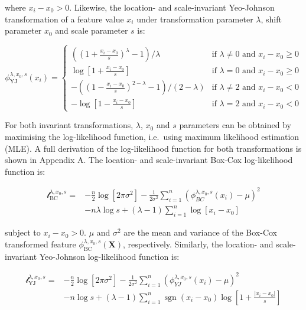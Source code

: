 \documentclass[
  a4paper,
]{article}
\DeclareMathOperator{\sgn}{sgn}
\begin{document}
where \(x_i - x_0 > 0\). Likewise, the location- and scale-invariant
Yeo-Johnson transformation of a feature value \(x_i\) under
transformation parameter \(\lambda\), shift parameter \(x_0\) and scale
parameter \(s\) is:

\begin{equation}
\label{eqn:yeo-johnson-invariant}
\phi_{\text{YJ}}^{\lambda, x_0, s} (x_i) = 
\begin{cases}
\left( \left( 1 + \frac{x_i - x_0}{s}\right)^\lambda - 1\right) / \lambda & \text{if } \lambda \neq 0 \text{ and } x_i - x_0 \geq 0\\
\log\left[1 + \frac{x_i - x_0}{s}\right] & \text{if } \lambda = 0 \text{ and } x_i - x_0 \geq 0\\
-\left( \left( 1 - \frac{x_i - x_0}{s}\right)^{2 - \lambda} - 1 \right) / \left(2 - \lambda \right) & \text{if } \lambda \neq 2 \text{ and } x_i - x_0 < 0\\
-\log\left[1 - \frac{x_i - x_0}{s}\right] & \text{if } \lambda = 2 \text{ and } x_i - x_0 < 0
\end{cases}
\end{equation}

For both invariant transformations, \(\lambda\), \(x_0\) and \(s\)
parameters can be obtained by maximising the log-likelihood function,
i.e.~using maximum likelihood estimation (MLE). A full derivation of the
log-likelihood function for both transformations is shown in Appendix A.
The location- and scale-invariant Box-Cox log-likelihood function is:

\begin{equation}
\label{eqn:box-cox-invariant-log-likelihood}
\begin{split}
\mathcal{l}_{\text{BC}}^{\lambda, x_0, s} = & -\frac{n}{2} \log \left[2 \pi \sigma^2 \right] -\frac{1}{2 \sigma^2} \sum_{i=1}^n \left( \phi_{BC}^{\lambda, x_0, s}(x_i) - \mu \right)^2 \\
& -n \lambda \log s + \left( \lambda - 1 \right) \sum_{i=1}^n \log \left[ x_i - x_0 \right]
\end{split}
\end{equation}

subject to \(x_i - x_0 > 0\). \(\mu\) and \(\sigma^2\) are the mean and
variance of the Box-Cox transformed feature
\(\phi_{\text{BC}}^{\lambda, x_0, s} (\mathbf{X})\), respectively.
Similarly, the location- and scale-invariant Yeo-Johnson log-likelihood
function is:

\begin{equation}
\label{eqn:yeo-johnson-invariant-log-likelihood}
\begin{split}
\mathcal{l}_{\text{YJ}}^{\lambda, x_0, s} = & -\frac{n}{2} \log\left[2 \pi \sigma^2\right] -\frac{1}{2 \sigma^2} \sum_{i=1}^n \left( \phi_{YJ}^{\lambda, x_0, s}(x_i) - \mu \right)^2 \\
& - n \log s + (\lambda - 1) \sum_{i=1}^n \sgn(x_i - x_0) \log \left[1 + \frac{|x_i - x_0|}{s} \right]
\end{split}
\end{equation}
\end{document}
